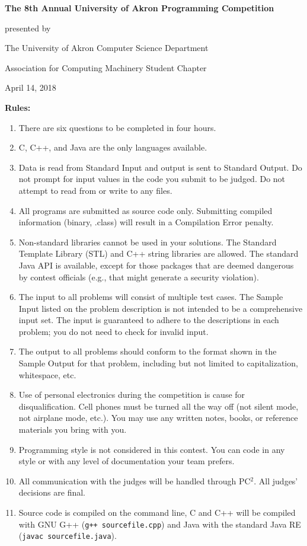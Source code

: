 \begin{center}
\large
\textbf{The 8th Annual University of Akron Programming Competition}

\vspace{.25in}

presented by

The University of Akron Computer Science Department

Association for Computing Machinery Student Chapter

\vspace{.25in}

April 14, 2018
\end{center}

\textbf{Rules:}
\begin{enumerate} \itemsep10pt \parskip0pt 
\item There are six questions to be completed in four hours.
\item C, C++, and Java are the only languages available.
\item Data is read from Standard Input and output is sent to Standard Output. Do not prompt for input values in the code you submit to be judged. Do not attempt to read from or write to any files.
\item All programs are submitted as source code only. Submitting compiled information (binary, .class) will result in a Compilation Error penalty.
\item Non-standard libraries cannot be used in your solutions. The Standard Template Library (STL) and C++ string libraries are allowed. The standard Java API is available, except for those packages that are deemed dangerous by contest officials (e.g., that might generate a security violation).
\item The input to all problems will consist of multiple test cases. The Sample Input listed on the problem description is not intended to be a comprehensive input set. The input is guaranteed to adhere to the descriptions in each problem; you do not need to check for invalid input.
\item The output to all problems should conform to the format shown in the Sample Output for that problem, including but not limited to capitalization, whitespace, etc.
\item Use of personal electronics during the competition is cause for disqualification. Cell phones must be turned all the way off (not silent mode, not airplane mode, etc.). You may use any written notes, books, or reference materials you bring with you.
\item Programming style is not considered in this contest. You can code in any style or with any level of documentation your team prefers.
\item All communication with the judges will be handled through PC$^2$. All judges’ decisions are final.
\item Source code is compiled on the command line, C and C++ will be compiled with GNU G++ (\texttt{g++ sourcefile.cpp}) and Java with the standard Java RE (\texttt{javac sourcefile.java}).
\end{enumerate}

